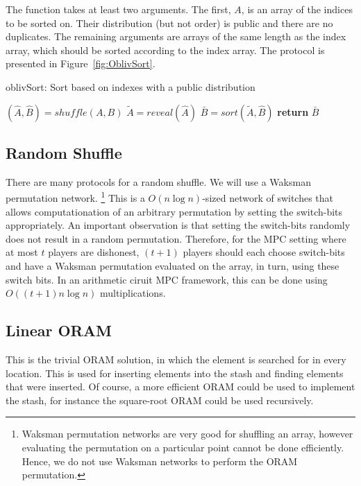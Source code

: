 The function takes at least two arguments. 
The first, $A$, is an array of the indices to be sorted on.
Their distribution (but not order) is public and there are no duplicates.
The remaining arguments are arrays of the same length as the index array,
which should be sorted according to the index array.
The protocol is presented in Figure~\ref{fig:OblivSort}.


\begin{algorithm}
\caption{oblivSort: Sort based on indexes with a public distribution}
\label{fig:OblivSort}
\begin{algorithmic}[0]

\State $(\hat{A} , \hat{B}) = shuffle(A, B)$
\State $\tilde{A} = reveal(\hat{A})$
\State $\bar{B} = sort(\tilde{A}, \hat{B})$
\State \textbf{return} $\bar{B}$
\EndProcedure

\end{algorithmic}
\end{algorithm}

\subsection{Random Shuffle}

There are many protocols for a random shuffle.
We will use a Waksman permutation network.
\footnote{Waksman permutation networks are very good for shuffling an array,
however evaluating the permutation on a particular point cannot be done
efficiently. Hence, we do not use Waksman networks to perform the ORAM permutation.}
This is a $O(n \log{n})$-sized network of switches that allows computationation
of an arbitrary permutation by setting the switch-bits appropriately.
An important observation is that setting the switch-bits randomly
does not result in a random permutation.
Therefore, for the MPC setting where at most $t$ players are dishonest,
$(t+1)$ players should each choose switch-bits and have a Waksman permutation
evaluated on the array, in turn, using these switch bits.  
In an arithmetic ciruit MPC framework, this can be done using $O( (t+1) n \log{n})$ multiplications.

\subsection{Linear ORAM}

This is the trivial ORAM solution, in which the element is searched for
in every location.
This is used for inserting elements into the stash and finding
elements that were inserted.
Of course, a more efficient ORAM could be used to implement the stash,
for instance the square-root ORAM could be used recursively.

